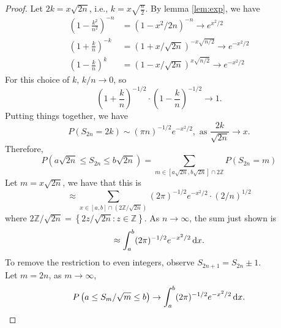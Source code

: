 \begin{proof}
	Let $2k=x\sqrt{2n}$, i.e., $k=x\sqrt{\frac{n}{2}}$. By lemma \ref{lem:exp}, we have
	\begin{equation*}
		\begin{aligned}
			\left(1-\frac{k^{2}}{n^{2}}\right)^{-n} & =\left(1-x^{2} / 2 n\right)^{-n} \rightarrow e^{x^{2} / 2}       \\
			\left(1+\frac{k}{n}\right)^{-k}         & =(1+x / \sqrt{2 n})^{-x \sqrt{n / 2}} \rightarrow e^{-x^{2} / 2} \\
			\left(1-\frac{k}{n}\right)^{k}          & =(1-x / \sqrt{2 n})^{x \sqrt{n / 2}} \rightarrow e^{-x^{2} / 2}
		\end{aligned}
	\end{equation*}
	For this choice of $k$, $k/n \rightarrow 0$, so
	\begin{equation*}
		\left(1+\frac{k}{n}\right)^{-1 / 2} \cdot\left(1-\frac{k}{n}\right)^{-1 / 2} \rightarrow 1.
	\end{equation*}
	Putting things together, we have
	\begin{equation*}
		P\left(S_{2 n}=2 k\right) \sim (\pi n)^{-1 / 2} e^{-x^{2} / 2}, \text{ as } \frac{2k}{\sqrt{2n}} \rightarrow x.
	\end{equation*}
	Therefore,
	\begin{equation*}
		P\left( a\sqrt{2n} \leq S_{2 n} \leq b\sqrt{2 n} \right) = \sum_{m \in \left[a\sqrt{2 n},b\sqrt{2 n}\right] \cap 2\mathbb{Z}} P\left(S_{2 n}=m\right)
	\end{equation*}
	Let $m=x\sqrt{2 n}$, we have that this is
	\begin{equation*}
		\approx \sum_{x \in \left[a,b\right] \cap \left(2\mathbb{Z} / \sqrt{2 n}\right)}(2 \pi)^{-1 / 2} e^{-x^{2} / 2}\cdot(2/n)^{1/2}
	\end{equation*}
	where $2\mathbb{Z} / \sqrt{2 n} = \left\{2z/\sqrt{2n} : z\in\mathbb{Z}\right\}$. As $n\rightarrow\infty$, the sum just shown is
	\begin{equation*}
		\approx \int_{a}^{b}(2 \pi)^{-1 / 2} e^{-x^{2} / 2} \mathop{}\!\mathrm{d} x.
	\end{equation*}
	To remove the restriction to even integers, observe $S_{2 n +1}=S_{2 n} \pm 1$.\\
	Let $m=2n$, as $m\rightarrow\infty$,
	\begin{equation*}
		P\left(a \leq S_{m} / \sqrt{m} \leq b\right) \rightarrow \int_{a}^{b}(2 \pi)^{-1 / 2} e^{-x^{2} / 2} \mathop{}\!\mathrm{d} x.
	\end{equation*}
\end{proof}

